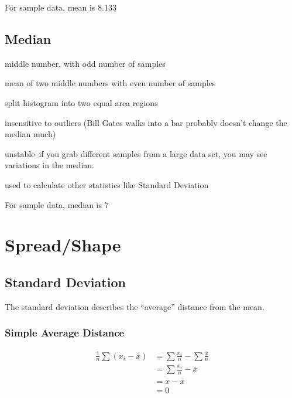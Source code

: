 \documentclass{exam}
\newcommand*\mean[1]{\overline{#1}}
\begin{document}
  For sample data, mean is 8.133

  \subsection{Median}

  \begin{itemize*}
    \item middle number, with odd number of samples

    \item mean of two middle numbers with even number of samples

    \item split histogram into two equal area regions

    \item insensitive to outliers (Bill Gates walks into a bar probably doesn't change the
      median much)

    \item unstable--if you grab different samples from a large data set, you may see
      variations in the median.

    \item used to calculate other statistics like Standard Deviation
  \end{itemize*}

  For sample data, median is 7

  \section{Spread/Shape}
  \subsection{Standard Deviation}

  The standard deviation describes the ``average'' distance from the mean.

  \subsubsection{Simple Average Distance}
  \begin{align*}
    \frac{1}{n} \sum (x_i - \mean{x}) & = \sum \frac{x_i}{n} - \sum \frac{ \mean{x} }{n} \\
                                      & = \sum \frac{x_i}{n} - \mean{x} \\
                                      & = \mean{x} - \mean{x} \\
                                      & = 0 \\
  \end{align*}
\end{document}
